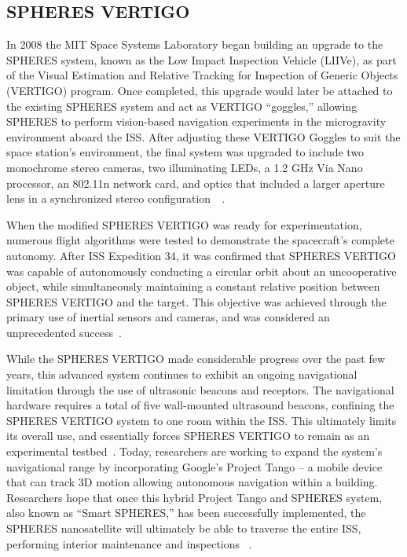 \documentclass[journal, 10pt]{IEEEtran}
\begin{document}
\subsection{SPHERES VERTIGO}
In 2008 the MIT Space Systems Laboratory began building an upgrade to the SPHERES system, known as the Low Impact Inspection Vehicle (LIIVe), as part of the Visual Estimation and Relative Tracking for Inspection of Generic Objects (VERTIGO) program. Once completed, this upgrade would later be attached to the existing SPHERES system and act as VERTIGO ``goggles,'' allowing SPHERES to perform vision-based navigation experiments in the microgravity environment aboard the ISS. After adjusting these VERTIGO Goggles to suit the space station's environment, the final system was upgraded to include two monochrome stereo cameras, two illuminating LEDs, a 1.2 GHz Via Nano processor, an 802.11n network card, and optics that included a larger aperture lens in a synchronized stereo configuration~~\cite{SPHERES, Vertigo 1, Vertigo2, Vertigo3}.

When the modified SPHERES VERTIGO was ready for experimentation, numerous flight algorithms were tested to demonstrate the spacecraft's complete autonomy. After ISS Expedition 34, it was confirmed that SPHERES VERTIGO was capable of autonomously conducting a circular orbit about an uncooperative object, while simultaneously maintaining a constant relative position between SPHERES VERTIGO and the target. This objective was achieved through the primary use of inertial sensors and cameras, and was considered an unprecedented success~\cite{Vertigo2, Vertigo3}.

While the SPHERES VERTIGO made considerable progress over the past few years, this advanced system continues to exhibit an ongoing navigational limitation through the use of ultrasonic beacons and receptors.  The navigational hardware requires a total of five wall-mounted ultrasound beacons, confining the SPHERES VERTIGO system to one room within the ISS. This ultimately  limits its overall use, and essentially forces SPHERES VERTIGO to remain as an experimental testbed~\cite{SPHERES, Vertigo 1, Vertigo2, Vertigo3}. Today, researchers are working to expand the system's navigational range by incorporating Google's Project Tango -- a mobile device that can track 3D motion allowing autonomous navigation within a building. Researchers hope that once this hybrid Project Tango and SPHERES system, also known as ``Smart SPHERES,'' has been successfully implemented, the SPHERES nanosatellite will ultimately be able to traverse the entire ISS, performing interior maintenance and inspections ~\cite{Tango}.
\end{document}

